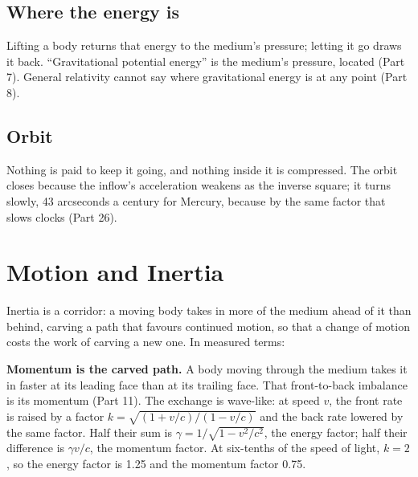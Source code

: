 \documentclass[11pt,a4paper]{article}
\begin{document}
\subsection{Where the energy is}

  Lifting a body returns that energy to the medium's pressure; letting it go draws it back. ``Gravitational potential energy'' is the medium's pressure, located (Part 7). General relativity cannot say where gravitational energy is at any point (Part 8).

\subsection{Orbit}

 Nothing is paid to keep it going, and nothing inside it is compressed. The orbit closes because the inflow's acceleration weakens as the inverse square; it turns slowly, 43 arcseconds a century for Mercury, because  by the same factor that slows clocks (Part 26).

\section{Motion and Inertia}

Inertia is a corridor: a moving body takes in more of the medium ahead of it than behind, carving a path that favours continued motion, so that a change of motion costs the work of carving a new one. In measured terms:

\begin{hypbar}
\textbf{Momentum is the carved path.} A body moving through the medium takes it in faster at its leading face than at its trailing face. That front-to-back imbalance is its momentum (Part 11). The exchange is wave-like: at speed $v$, the front rate is raised by a factor $k = \sqrt{(1+v/c)/(1-v/c)}$ and the back rate lowered by the same factor. Half their sum is $\gamma = 1/\sqrt{1-v^2/c^2}$, the energy factor; half their difference is $\gamma v/c$, the momentum factor. At six-tenths of the speed of light, $k = 2$, so the energy factor is 1.25 and the momentum factor 0.75.
\end{hypbar}
\end{document}
